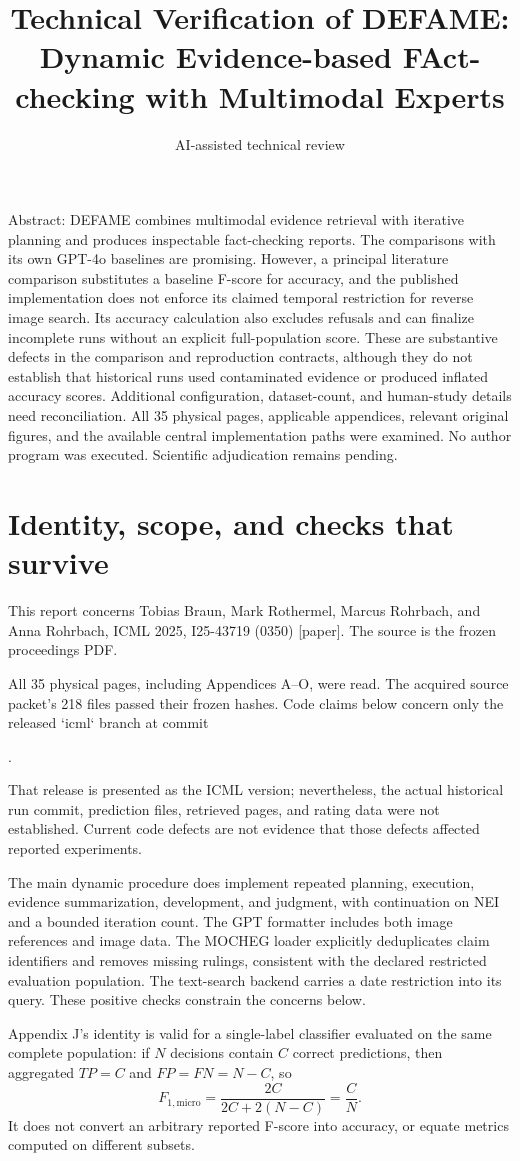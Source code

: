 \documentclass[10pt]{article}
\title{Technical Verification of DEFAME: Dynamic Evidence-based FAct-checking with Multimodal Experts}
\author{AI-assisted technical review}
\date{}
\begin{document}
\maketitle
Abstract: DEFAME combines multimodal evidence retrieval with iterative planning and produces inspectable fact-checking reports. The comparisons with its own GPT-4o baselines are promising. However, a principal literature comparison substitutes a baseline F-score for accuracy, and the published implementation does not enforce its claimed temporal restriction for reverse image search. Its accuracy calculation also excludes refusals and can finalize incomplete runs without an explicit full-population score. These are substantive defects in the comparison and reproduction contracts, although they do not establish that historical runs used contaminated evidence or produced inflated accuracy scores. Additional configuration, dataset-count, and human-study details need reconciliation. All 35 physical pages, applicable appendices, relevant original figures, and the available central implementation paths were examined. No author program was executed. Scientific adjudication remains pending.\par
\section*{Identity, scope, and checks that survive}
This report concerns Tobias Braun, Mark Rothermel, Marcus Rohrbach, and Anna Rohrbach, ICML 2025, I25-43719 (0350) [paper]. The source is the frozen proceedings PDF.\par
All 35 physical pages, including Appendices A–O, were read. The acquired source packet’s 218 files passed their frozen hashes. Code claims below concern only the released `icml` branch at commit\par
.\par
That release is presented as the ICML version; nevertheless, the actual historical run commit, prediction files, retrieved pages, and rating data were not established. Current code defects are not evidence that those defects affected reported experiments.\par
The main dynamic procedure does implement repeated planning, execution, evidence summarization, development, and judgment, with continuation on NEI and a bounded iteration count. The GPT formatter includes both image references and image data. The MOCHEG loader explicitly deduplicates claim identifiers and removes missing rulings, consistent with the declared restricted evaluation population. The text-search backend carries a date restriction into its query. These positive checks constrain the concerns below.\par
Appendix J’s identity is valid for a single-label classifier evaluated on the same complete population: if \(N\) decisions contain \(C\) correct predictions, then aggregated \(TP=C\) and \(FP=FN=N-C\), so \[F_{1,\mathrm{micro}}=\frac{2C}{2C+2(N-C)}=\frac CN.\] It does not convert an arbitrary reported F-score into accuracy, or equate metrics computed on different subsets.\par
\end{document}
